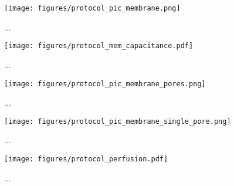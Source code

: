 \begin{figure}[h]
\begin{centering}
\texttt{[image: figures/protocol\_pic\_membrane.png]}
\caption[Diagram of membrane on Teflon patch tube]{...}
\label{fig:helicase_data}
\end{centering}
\end{figure}

\begin{figure}[h]
\begin{centering}
\texttt{[image: figures/protocol\_mem\_capacitance.pdf]}
\caption[Monitoring membrane capacitance]{...}
\label{fig:helicase_data}
\end{centering}
\end{figure}

\begin{figure}[h]
\begin{centering}
\texttt{[image: figures/protocol\_pic\_membrane\_pores.png]}
\caption[Diagram of nanopore introduction]{...}
\label{fig:helicase_data}
\end{centering}
\end{figure}

\begin{figure}[h]
\begin{centering}
\texttt{[image: figures/protocol\_pic\_membrane\_single\_pore.png]}
\caption[Diagram of single nanopore capture]{...}
\label{fig:helicase_data}
\end{centering}
\end{figure}

\begin{figure}[h]
\begin{centering}
\texttt{[image: figures/protocol\_perfusion.pdf]}
\caption[Setup for removing nanopores by buffer perfusion]{...}
\label{fig:helicase_data}
\end{centering}
\end{figure}